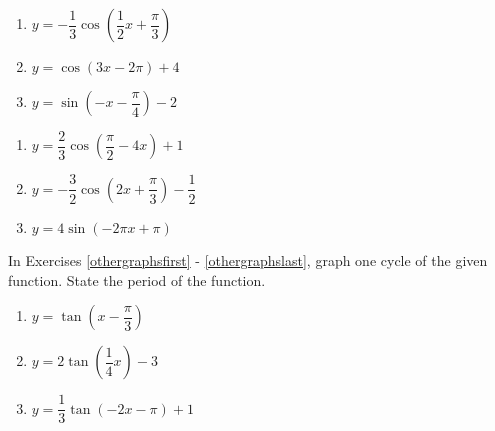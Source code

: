 \begin{multicols}{3}

\begin{enumerate}

\setcounter{enumi}{\value{HW}}

\item $y = -\dfrac{1}{3}\cos \left( \dfrac{1}{2}x + \dfrac{\pi}{3} \right)$
\item $y = \cos (3x - 2\pi) + 4$ 
\item $y = \sin \left( -x - \dfrac{\pi}{4} \right) - 2$ 

\setcounter{HW}{\value{enumi}}

\end{enumerate}

\end{multicols}

\begin{multicols}{3}

\begin{enumerate}

\setcounter{enumi}{\value{HW}}

\item $y = \dfrac{2}{3} \cos \left( \dfrac{\pi}{2} - 4x \right) + 1$
\item $y = -\dfrac{3}{2} \cos \left( 2x + \dfrac{\pi}{3} \right) - \dfrac{1}{2}$
\item $y = 4\sin (-2\pi x + \pi)$   \label{sinecosinegraphlast}

\setcounter{HW}{\value{enumi}}

\end{enumerate}

\end{multicols}

In Exercises \ref{othergraphsfirst} - \ref{othergraphslast}, graph one cycle of the given function.  State the period of the function.

\begin{multicols}{3}

\begin{enumerate}

\setcounter{enumi}{\value{HW}}

\item $y = \tan \left(x - \dfrac{\pi}{3} \right)$  \label{othergraphsfirst}
\item $y = 2\tan \left( \dfrac{1}{4}x \right) - 3$
\item $y = \dfrac{1}{3}\tan(-2x - \pi) + 1$

\setcounter{HW}{\value{enumi}}

\end{enumerate}

\end{multicols}

